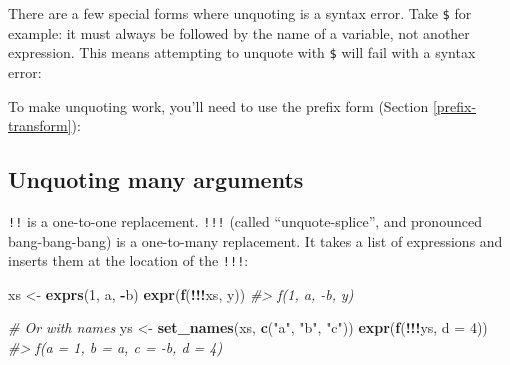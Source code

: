 \documentclass[]{book}
\makeatletter
\newenvironment{Shaded}{\begin{snugshade}}{\end{snugshade}}
\newcommand{\CommentTok}[1]{\textcolor[rgb]{0.37,0.37,0.37}{\textit{#1}}}
\newcommand{\DataTypeTok}[1]{\textcolor[rgb]{0.27,0.27,0.27}{#1}}
\newcommand{\DecValTok}[1]{\textcolor[rgb]{0.06,0.06,0.06}{#1}}
\newcommand{\KeywordTok}[1]{\textcolor[rgb]{0.27,0.27,0.27}{\textbf{#1}}}
\newcommand{\NormalTok}[1]{#1}
\newcommand{\OperatorTok}[1]{\textcolor[rgb]{0.43,0.43,0.43}{\textbf{#1}}}
\newcommand{\StringTok}[1]{\textcolor[rgb]{0.5,0.5,0.5}{#1}}
\newcommand{\indexc}[1]{\index{#1@\texttt{#1}}}
\makeatother
\begin{document}

There are a few special forms where unquoting is a syntax error. Take \texttt{\$} for example: it must always be followed by the name of a variable, not another expression. This means attempting to unquote with \texttt{\$} will fail with a syntax error:

\begin{Shaded}
\end{Shaded}

To make unquoting work, you'll need to use the prefix form (Section \ref{prefix-transform}):

\begin{Shaded}
\end{Shaded}

\hypertarget{unquoting-many-arguments}{%
\subsection{Unquoting many arguments}\label{unquoting-many-arguments}}

\indexc{"!"!"!}


\texttt{!!} is a one-to-one replacement. \texttt{!!!} (called ``unquote-splice'', and pronounced bang-bang-bang) is a one-to-many replacement. It takes a list of expressions and inserts them at the location of the \texttt{!!!}:

\begin{Shaded}
\begin{Highlighting}[]
\NormalTok{xs <-}\StringTok{ }\KeywordTok{exprs}\NormalTok{(}\DecValTok{1}\NormalTok{, a, }\OperatorTok{-}\NormalTok{b)}
\KeywordTok{expr}\NormalTok{(}\KeywordTok{f}\NormalTok{(}\OperatorTok{!!!}\NormalTok{xs, y))}
\CommentTok{#> f(1, a, -b, y)}

\CommentTok{# Or with names}
\NormalTok{ys <-}\StringTok{ }\KeywordTok{set_names}\NormalTok{(xs, }\KeywordTok{c}\NormalTok{(}\StringTok{"a"}\NormalTok{, }\StringTok{"b"}\NormalTok{, }\StringTok{"c"}\NormalTok{))}
\KeywordTok{expr}\NormalTok{(}\KeywordTok{f}\NormalTok{(}\OperatorTok{!!!}\NormalTok{ys, }\DataTypeTok{d =} \DecValTok{4}\NormalTok{))}
\CommentTok{#> f(a = 1, b = a, c = -b, d = 4)}
\end{Highlighting}
\end{Shaded}
\end{document}
